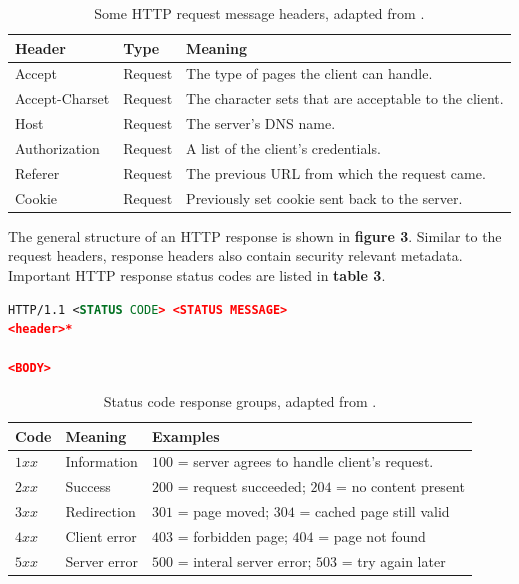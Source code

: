 \begin{table}[H]
	\caption{Some HTTP request message headers, adapted from \cite{Tanenbaum:2002:CN:572404}.}
	\label{tab:}
	\begin{tabular}{p{75px} | p{75px} | p{200px} }
		\textbf{Header} & \textbf{Type} 	& \textbf{Meaning} \\
		\hline
		Accept					& Request & The type of pages the client can handle. 							\\
		Accept-Charset	& Request & The character sets that are acceptable to the client. \\
		Host						& Request & The server's DNS name. 																\\
		Authorization		& Request & A list of the client's credentials. 									\\
		Referer					& Request & The previous URL from which the request came.					\\
		Cookie					& Request & Previously set cookie sent back to the server. 				\\
		\hline
	\end{tabular}
\end{table}


The general structure of an HTTP response is shown in \textbf{figure 3}. Similar to the request headers, response headers also contain security relevant metadata. Important HTTP response status codes are listed in \textbf{table 3}.

\begin{lstlisting}[language=xml, caption=HTTP response., label=listing:http-request]
HTTP/1.1 <STATUS CODE> <STATUS MESSAGE>
<header>*

<BODY>
\end{lstlisting}

\begin{table}[H]
	\caption{Status code response groups, adapted from \cite{Tanenbaum:2002:CN:572404}.}
	\label{tab:}
	\begin{tabular}{p{75px} | p{75px} | p{200px} }
		\textbf{Code} & \textbf{Meaning} 	& \textbf{Examples} \\
		\hline
		$1xx$	& Information 	& $100$ = server agrees to handle client's request. 		\\
		$2xx$	& Success 			& $200$ = request succeeded; $204$ = no content present \\
		$3xx$	& Redirection 	& $301$ = page moved; $304$ = cached page still valid 	\\
		$4xx$	& Client error	& $403$ = forbidden page; $404$ = page not found 				\\
		$5xx$	& Server error	& $500$ = interal server error; $503$ = try again later \\
		\hline
	\end{tabular}
\end{table}



